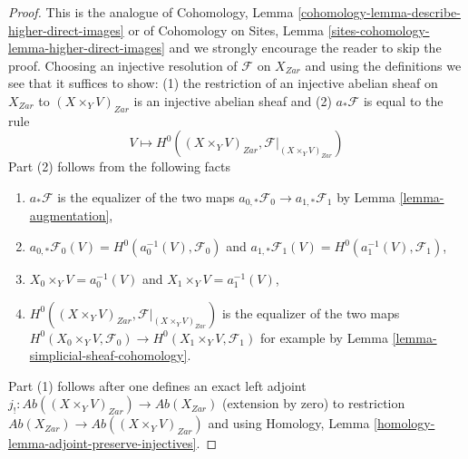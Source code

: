 \documentclass{stacks-project}
\theoremstyle{plain}
\theoremstyle{definition}
\theoremstyle{remark}
\numberwithin{equation}{subsection}
\begin{document}
\begin{proof}
This is the analogue of
Cohomology, Lemma \ref{cohomology-lemma-describe-higher-direct-images} or of
Cohomology on Sites, Lemma \ref{sites-cohomology-lemma-higher-direct-images}
and we strongly encourage the reader to skip the proof.
Choosing an injective resolution of $\mathcal{F}$ on
$X_{Zar}$ and using the definitions we see that it suffices to show:
(1) the restriction of an injective abelian
sheaf on $X_{Zar}$ to $(X \times_Y V)_{Zar}$ is an injective abelian sheaf and
(2) $a_*\mathcal{F}$ is equal to the rule
$$
V \longmapsto H^0((X \times_Y V)_{Zar}, \mathcal{F}|_{(X \times_Y V)_{Zar}})
$$
Part (2) follows from the following facts
\begin{enumerate}
\item[(2a)] $a_*\mathcal{F}$ is the equalizer of the two maps
$a_{0, *}\mathcal{F}_0 \to a_{1, *}\mathcal{F}_1$
by Lemma \ref{lemma-augmentation},
\item[(2b)] $a_{0, *}\mathcal{F}_0(V) =
H^0(a_0^{-1}(V), \mathcal{F}_0)$ and
$a_{1, *}\mathcal{F}_1(V) = H^0(a_1^{-1}(V), \mathcal{F}_1)$,
\item[(2c)] $X_0 \times_Y V = a_0^{-1}(V)$ and $X_1 \times_Y V = a_1^{-1}(V)$,
\item[(2d)] $H^0((X \times_Y V)_{Zar}, \mathcal{F}|_{(X \times_Y V)_{Zar}})$
is the equalizer of the two maps
$H^0(X_0 \times_Y V, \mathcal{F}_0) \to H^0(X_1 \times_Y V, \mathcal{F}_1)$
for example by Lemma \ref{lemma-simplicial-sheaf-cohomology}.
\end{enumerate}
Part (1) follows after one defines an exact left adjoint
$j_! : \textit{Ab}((X \times_Y V)_{Zar}) \to \textit{Ab}(X_{Zar})$
(extension by zero) to restriction
$\textit{Ab}(X_{Zar}) \to \textit{Ab}((X \times_Y V)_{Zar})$
and using Homology, Lemma \ref{homology-lemma-adjoint-preserve-injectives}.
\end{proof}
\end{document}
